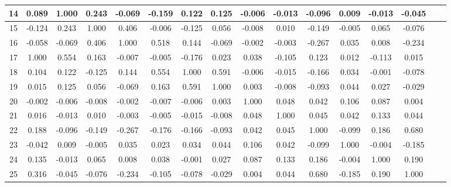 \documentclass[ %
                    author={Sam Phippen},
                supervisor={Dr. Rafal Bogacz},
                     title={Real time voice activity detectors in noisy personal computing environments},
                  subtitle={},
                    degree={MEng},
                      year={2012} ]{thesis}
\begin{document}
\begin{table}
\begin{tabular}{|c|c|c|c|c|c|c|c|c|c|c|c|c|c|c|c|}
        14 & 0.089  & 1.000  & 0.243  & -0.069 & -0.159 & 0.122  & 0.125  & -0.006 & -0.013 & -0.096 & 0.009  & -0.013 & -0.045 \\ \hline
        15 & -0.124 & 0.243  & 1.000  & 0.406  & -0.006 & -0.125 & 0.056  & -0.008 & 0.010  & -0.149 & -0.005 & 0.065  & -0.076 \\ \hline
        16 & -0.058 & -0.069 & 0.406  & 1.000  & 0.518  & 0.144  & -0.069 & -0.002 & -0.003 & -0.267 & 0.035  & 0.008  & -0.234 \\ \hline
        17 & 1.000  & 0.554  & 0.163  & -0.007 & -0.005 & -0.176 & 0.023  & 0.038  & -0.105 & 0.123  & 0.012  & -0.113 & 0.015\\ \hline
        18 & 0.104  & 0.122  & -0.125 & 0.144  & 0.554  & 1.000  & 0.591  & -0.006 & -0.015 & -0.166 & 0.034  & -0.001 & -0.078 \\ \hline
        19 & 0.015  & 0.125  & 0.056  & -0.069 & 0.163  & 0.591  & 1.000  & 0.003  & -0.008 & -0.093 & 0.044  & 0.027  & -0.029 \\ \hline
        20 & -0.002 & -0.006 & -0.008 & -0.002 & -0.007 & -0.006 & 0.003  & 1.000  & 0.048  & 0.042  & 0.106  & 0.087  & 0.004 \\ \hline
        21 & 0.016  & -0.013 & 0.010  & -0.003 & -0.005 & -0.015 & -0.008 & 0.048  & 1.000  & 0.045  & 0.042  & 0.133  & 0.044 \\ \hline
        22 & 0.188  & -0.096 & -0.149 & -0.267 & -0.176 & -0.166 & -0.093 & 0.042  & 0.045  & 1.000  & -0.099 & 0.186  & 0.680 \\ \hline
        23 & -0.042 & 0.009  & -0.005 & 0.035  & 0.023  & 0.034  & 0.044  & 0.106  & 0.042  & -0.099 & 1.000  & -0.004 & -0.185 \\ \hline
        24 & 0.135  & -0.013 & 0.065  & 0.008  & 0.038  & -0.001 & 0.027  & 0.087  & 0.133  & 0.186  & -0.004 & 1.000  & 0.190 \\ \hline
        25 & 0.316  & -0.045 & -0.076 & -0.234 & -0.105 & -0.078 & -0.029 & 0.004  & 0.044  & 0.680  & -0.185 & 0.190  & 1.000 \\ \hline
    \end{tabular}
\end{table}
\end{document}
